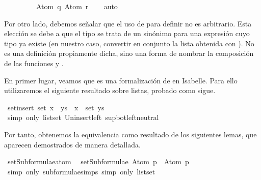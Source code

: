 \begin{isabellebody}
\ \ \ \ \ \ \ \ \ Atom\ q{\isacharcomma}\ Atom\ r{\isacharbraceright}{\isachardoublequoteclose}\isanewline
\ \ \isamarkupfalse%
\ auto%
\endisatagproof
{\isafoldproof}%
%
\isadelimproof
\ \ \ \isanewline
%
\endisadelimproof
{}\isamarkupfalse%
%
\begin{isamarkuptext}%
Por otro lado, debemos señalar que el uso de 
   para definir  no es 
  arbitrario. Esta elección se debe a que el tipo  
  se trata de un sinónimo para una expresión cuyo tipo ya existe (en 
  nuestro caso, convertir en conjunto la lista obtenida con 
  ). No es una definición propiamente dicha, sino 
  una forma de nombrar la composición de las funciones  y 
  .

  En primer lugar, veamos que  es una
  formalización de  en Isabelle. Para ello 
  utilizaremos el siguiente resultado sobre listas, probado como sigue.%
\end{isamarkuptext}\isamarkuptrue%
\isamarkupfalse%
\ set{\isacharunderscore}insert{\isacharcolon}\ {\isachardoublequoteopen}set\ {\isacharparenleft}x\ {\isacharhash}\ ys{\isacharparenright}\ {\isacharequal}\ {\isacharbraceleft}x{\isacharbraceright}\ {\isasymunion}\ set\ ys{\isachardoublequoteclose}\isanewline
%
\isadelimproof
\ \ %
\endisadelimproof
%
\isatagproof
{}\isamarkupfalse%
\ {\isacharparenleft}simp\ only{\isacharcolon}\ list{\isachardot}set{\isacharparenleft}{}{\isacharparenright}\ Un{\isacharunderscore}insert{\isacharunderscore}left\ sup{\isacharunderscore}bot{\isachardot}left{\isacharunderscore}neutral{\isacharparenright}%
\endisatagproof
{\isafoldproof}%
%
\isadelimproof
%
\endisadelimproof
%
\begin{isamarkuptext}%
Por tanto, obtenemos la equivalencia como resultado de los 
  siguientes lemas, que aparecen demostrados de manera detallada.%
\end{isamarkuptext}\isamarkuptrue%
\isamarkupfalse%
\ setSubformulae{\isacharunderscore}atom{\isacharcolon}\isanewline
\ \ {\isachardoublequoteopen}setSubformulae\ {\isacharparenleft}Atom\ p{\isacharparenright}\ {\isacharequal}\ {\isacharbraceleft}Atom\ p{\isacharbraceright}{\isachardoublequoteclose}\isanewline
%
\isadelimproof
\ \ \ \ %
\endisadelimproof
%
\isatagproof
{}\isamarkupfalse%
\ {\isacharparenleft}simp\ only{\isacharcolon}\ subformulae{\isachardot}simps{\isacharparenleft}{}{\isacharparenright}{\isacharcomma}\ simp\ only{\isacharcolon}\ list{\isachardot}set{\isacharparenright}%

\end{isabellebody}
